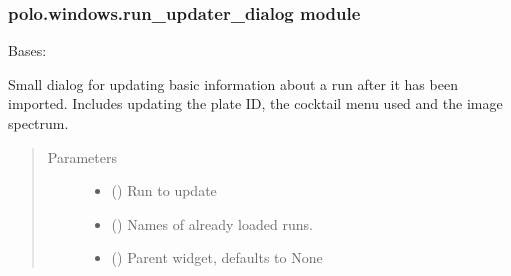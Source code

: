 \documentclass[letterpaper,10pt,english]{sphinxmanual}
\begin{document}
\subsubsection{polo.windows.run\_updater\_dialog module}
\label{\detokenize{polo.windows:module-polo.windows.run_updater_dialog}}\label{\detokenize{polo.windows:polo-windows-run-updater-dialog-module}}

\begin{fulllineitems}
\label{\detokenize{polo.windows:polo.windows.run_updater_dialog.RunUpdaterDialog}}
Bases: 

Small dialog for updating basic information about a run after
it has been imported. Includes updating the plate ID, the cocktail
menu used and the image spectrum.
\begin{quote}\begin{description}
\item[{Parameters}] \leavevmode\begin{itemize}
\item {} 
 ({\hyperref[\detokenize{polo.crystallography:polo.crystallography.run.Run}]{}}) \textendash{} Run to update

\item {} 
 () \textendash{} Names of already loaded runs.

\item {} 
 (\sphinxstyleliteralemphasis{\sphinxupquote{, }}) \textendash{} Parent widget, defaults to None


\end{itemize}
\end{description}
\end{quote}
\end{fulllineitems}
\end{document}
